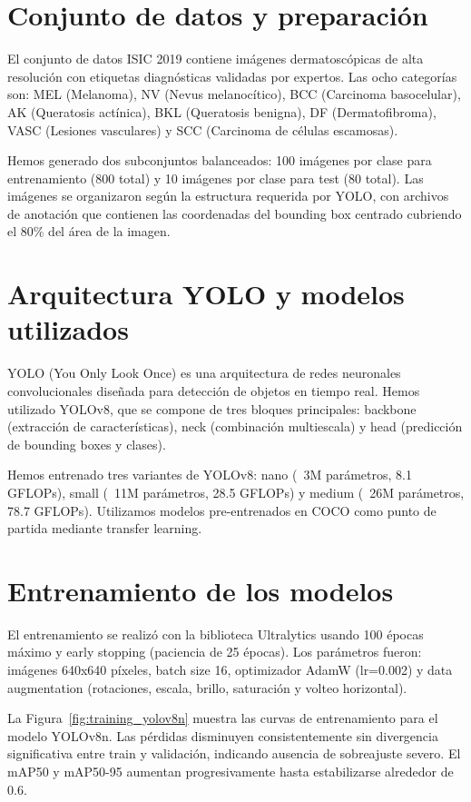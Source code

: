 \documentclass{llncs}
\begin{document}
\section{Conjunto de datos y preparación}

El conjunto de datos ISIC 2019 contiene imágenes dermatoscópicas de alta resolución con etiquetas diagnósticas validadas por expertos. Las ocho categorías son: MEL (Melanoma), NV (Nevus melanocítico), BCC (Carcinoma basocelular), AK (Queratosis actínica), BKL (Queratosis benigna), DF (Dermatofibroma), VASC (Lesiones vasculares) y SCC (Carcinoma de células escamosas).

Hemos generado dos subconjuntos balanceados: 100 imágenes por clase para entrenamiento (800 total) y 10 imágenes por clase para test (80 total). Las imágenes se organizaron según la estructura requerida por YOLO, con archivos de anotación que contienen las coordenadas del bounding box centrado cubriendo el 80\% del área de la imagen.

\section{Arquitectura YOLO y modelos utilizados}

YOLO (You Only Look Once) es una arquitectura de redes neuronales convolucionales diseñada para detección de objetos en tiempo real. Hemos utilizado YOLOv8, que se compone de tres bloques principales: backbone (extracción de características), neck (combinación multiescala) y head (predicción de bounding boxes y clases).

Hemos entrenado tres variantes de YOLOv8: nano (~3M parámetros, 8.1 GFLOPs), small (~11M parámetros, 28.5 GFLOPs) y medium (~26M parámetros, 78.7 GFLOPs). Utilizamos modelos pre-entrenados en COCO como punto de partida mediante transfer learning.

\section{Entrenamiento de los modelos}

El entrenamiento se realizó con la biblioteca Ultralytics usando 100 épocas máximo y early stopping (paciencia de 25 épocas). Los parámetros fueron: imágenes 640x640 píxeles, batch size 16, optimizador AdamW (lr=0.002) y data augmentation (rotaciones, escala, brillo, saturación y volteo horizontal).

La Figura~\ref{fig:training_yolov8n} muestra las curvas de entrenamiento para el modelo YOLOv8n. Las pérdidas disminuyen consistentemente sin divergencia significativa entre train y validación, indicando ausencia de sobreajuste severo. El mAP50 y mAP50-95 aumentan progresivamente hasta estabilizarse alrededor de 0.6.
\end{document}
